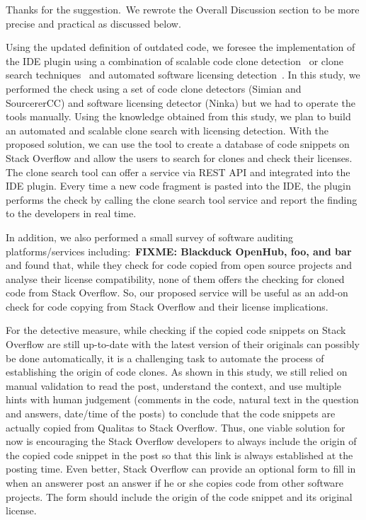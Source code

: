 \documentclass[a4paper,twoside,10pt]{reviewresponse}
\newcommand\FIXME[1]{{\color{red}\textbf{FIXME: #1}}}
\begin{document}
Thanks for the suggestion.~We rewrote the Overall Discussion section to be more precise and practical as discussed below. 

Using the updated definition of outdated code, we foresee the implementation of the IDE plugin using a combination of scalable code clone detection~\citep{Sajnani2016} or clone search techniques~\citep{Kim2018} and automated software licensing detection~\citep{German2010}.
In this study, we performed the check using a set of code clone detectors (Simian and SourcererCC) and software licensing detector (Ninka) but we had to operate the tools manually. Using the knowledge obtained from this study, we plan to build an automated and scalable clone search with licensing detection. With the proposed solution, we can use the tool to create a database of code snippets on Stack Overflow and allow the users to search for clones and check their licenses. The clone search tool can offer a service via REST API and integrated into the IDE plugin. Every time a new code fragment is pasted into the IDE, the plugin performs the check by calling the clone search tool service and report the finding to the developers in real time.

In addition, we also performed a small survey of software auditing platforms/services including:~\FIXME{Blackduck OpenHub, foo, and bar} and found that, while they check for code copied from open source projects and analyse their license compatibility, none of them offers the checking for cloned code from Stack Overflow. So, our proposed service will be useful as an add-on check for code copying from Stack Overflow and their license implications.

For the detective measure, while checking if the copied code snippets on Stack Overflow are still up-to-date with the latest version of their originals can possibly be done automatically, it is a challenging task to automate the process of establishing the origin of code clones. As shown in this study, we still relied on manual validation to read the post, understand the context, and use multiple hints with human judgement (comments in the code, natural text in the question and answers, date/time of the posts) to conclude that the code snippets are actually copied from Qualitas to Stack Overflow. Thus, one viable solution for now is encouraging the Stack Overflow developers to always include the origin of the copied code snippet in the post so that this link is always established at the posting time. Even better, Stack Overflow can provide an optional form to fill in when an answerer post an answer if he or she copies code from other software projects. The form should include the origin of the code snippet and its original license.
\end{document}
